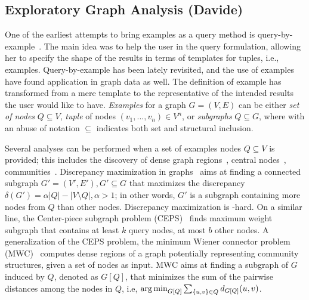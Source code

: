 \subsection{Exploratory Graph Analysis (Davide)} 


\noindent One of the earliest attempts to bring examples as a query method is query-by-example~\citep{zloof1975query}.
The main idea was to help the user in the query formulation, allowing her to specify the shape of the results in terms of templates for tuples, i.e., examples.
Query-by-example has been lately revisited, and the use of examples have found application in graph data as well. 
The definition of example has transformed from a mere template to the representative of the intended results the user would like to have.
\emph{Examples} for a graph $G = (V,E)$ can be either \emph{set of nodes} $Q \subseteq V$, \emph{tuple} of nodes $(v_1, ..., v_n) \in V^n$, or \emph{subgraphs} $Q \subseteq G$, where with an abuse of notation $\subseteq$ indicates both set and structural inclusion. 

 Several analyses can be performed when a set of examples nodes $Q\subseteq V$ is provided; this includes the discovery of dense graph regions~\citep{gionis2015bump,ruchansky2015minimum}, central nodes~\citep{tong2006center}, communities~\citep{staudt2014detecting,perozzi2014focused}.%
Discrepancy maximization in graphs~\citep{gionis2015bump} aims at finding a connected subgraph $G' = (V', E'), G' \subseteq G$ that maximizes the discrepancy $\delta(G'){=}\alpha|Q|{-}|V{\setminus}Q|, \alpha > 1$; in other words, $G'$ is a subgraph containing more nodes from $Q$ than other nodes. 
Discrepancy maximization is \NP-hard. 
On a similar line, the Center-piece subgraph problem (CEPS)~\citep{tong2006center} finds maximum weight subgraph that contains at least $k$ query nodes, at most $b$ other nodes. 
A generalization of the CEPS problem, the minimum Wiener connector problem (MWC)~\citep{ruchansky2015minimum} computes dense regions of a graph potentially representing community structures, given a set of nodes as input. MWC aims at finding a subgraph of $G$ induced by $Q$, denoted as $G[Q]$, that minimizes the sum of the pairwise distances among the nodes in $Q$, i.e, $\operatorname*{\arg\min}_{G[Q]}\sum_{\{u,v\}{}\in{}Q}{}d_{G[Q]}(u,v)$. 

